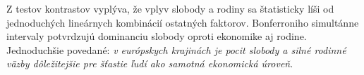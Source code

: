 \documentclass[12pt,a4paper]{article}
\begin{document}
Z testov kontrastov vyplýva, že vplyv slobody a rodiny sa štatisticky
líši od jednoduchých lineárnych kombinácií ostatných faktorov.
Bonferroniho simultánne intervaly potvrdzujú dominanciu slobody
oproti ekonomike aj rodine. Jednoduchšie povedané:
\textit{v európskych krajinách je pocit slobody a silné rodinné
väzby dôležitejšie pre šťastie ľudí ako samotná ekonomická úroveň}.
\end{document}
